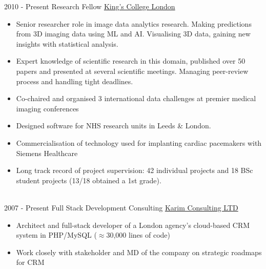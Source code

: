 \documentclass[letterpaper]{twentysecondcv} %
\begin{document}
\begin{twenty} %
\twentyitem
    	{2010 -}
		{Present}
        {Research Fellow}
        {\href{https://kclpure.kcl.ac.uk/portal/rashed.karim.html}{King's College London}}
        {}
        {\begin{itemize}
       \item Senior researcher role in image data analytics research. Making predictions from 3D imaging data using ML and AI. Visualising 3D data, gaining new insights with statistical analysis. 
\item Expert knowledge of scientific research in this domain, published over 50 papers and presented at several scientific meetings. Managing peer-review process and handling tight deadlines.
\item Co-chaired and organised 3 international data challenges at premier medical imaging conferences
\item Designed software for NHS research units in Leeds \& London. 
\item Commercialisation of technology used for implanting cardiac pacemakers with Siemens Healthcare
\item Long track record of project supervision: 42 individual projects and 18 BSc student projects (13/18 obtained a 1st grade). 
       
        \end{itemize}}
        \\
	\twentyitem
    	{2007 - }
		{Present}
        {Full Stack Development Consulting}
        {\href{http://www.desilvatutors.co.uk/}{Karim Consulting LTD}}
        {}
        {
        {
    \begin{itemize}
\item Architect and full-stack developer of a London agency's cloud-based CRM system in PHP/MySQL ($\approx$30,000 lines of code) 
		\item Work closely with stakeholder and MD of the company on strategic roadmaps for CRM 
    \end{itemize}}
        }
    

\end{twenty}
\end{document}
